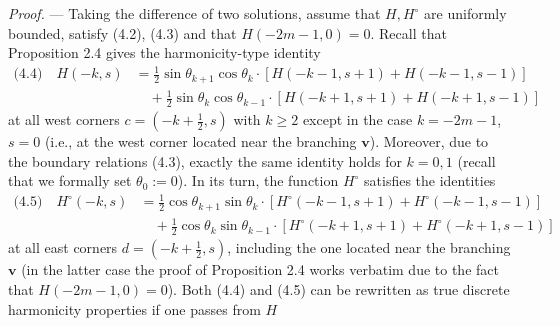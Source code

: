 \documentclass[11pt]{article}
\newcommand{\eql}[1]{\text{(#1)}\quad}
\newcommand{\bvv}{\mathbf{v}}
\begin{document}
\medskip
\noindent\emph{Proof.} --- Taking the difference of two solutions, assume
that $H,H^{\circ}$ are uniformly bounded, satisfy (4.2), (4.3) and that
$H(-2m-1,0) = 0$. Recall that Proposition 2.4 gives the harmonicity-type
identity
\begin{align*}
\eql{4.4} H(-k,s) &= \frac12\sin\theta_{k+1}\cos\theta_k
\cdot[H(-k-1,s+1)+H(-k-1,s-1)]\\
&\quad + \frac12\sin\theta_k\cos\theta_{k-1}
\cdot[H(-k+1,s+1)+H(-k+1,s-1)]
\end{align*}
at all west corners $c = (-k+\frac12,s)$ with $k \geqslant 2$ except in the
case $k = -2m-1$, $s = 0$ (i.e., at the west corner located near the branching
$\bvv$). Moreover, due to the boundary relations (4.3), exactly the same
identity holds for $k = 0,1$ (recall that we formally set $\theta_0 := 0$). In
its turn, the function $H^{\circ}$ satisfies the identities
\begin{align*}
\eql{4.5} H^{\circ}(-k,s) &= \frac12\cos\theta_{k+1}\sin\theta_k
\cdot[H^{\circ}(-k-1,s+1)+H^{\circ}(-k-1,s-1)]\\
&\quad + \frac12\cos\theta_k\sin\theta_{k-1}
\cdot[H^{\circ}(-k+1,s+1)+H^{\circ}(-k+1,s-1)]
\end{align*}
at all east corners $d = (-k+\frac12,s)$, including the one located near the
branching $\bvv$ (in the latter case the proof of Proposition 2.4 works
verbatim due to the fact that $H(-2m-1,0) = 0$). Both (4.4) and (4.5) can be
rewritten as true discrete harmonicity properties if one passes from $H$
\end{document}
